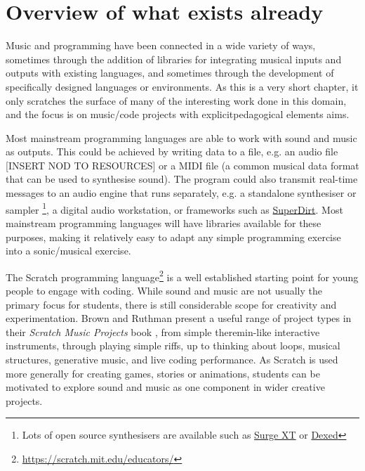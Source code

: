 \section{Overview of what exists already} \label{sec:literature}

Music and programming have been connected in a wide variety of ways, sometimes through the addition of libraries for integrating musical inputs and outputs with existing languages, and sometimes through the development of specifically designed languages or environments. As this is a very short chapter, it only scratches the surface of many of the interesting work done in this domain, and the focus is on music/code projects with explicitpedagogical elements aims.

Most mainstream programming languages are able to work with sound and music as outputs. This could be achieved by writing data to a file, e.g. an audio file [INSERT NOD TO RESOURCES] or a MIDI file (a common musical data format that can be used to synthesise sound). The program could also transmit real-time messages to an audio engine that runs separately, e.g. a standalone synthesiser or sampler \footnote{Lots of open source synthesisers are available such as \href{https://surge-synthesizer.github.io/}{Surge XT} or \href{https://asb2m10.github.io/dexed/}{Dexed}}, a digital audio workstation, or frameworks such as \href{https://github.com/musikinformatik/SuperDirt}{SuperDirt}. Most mainstream programming languages will have libraries available for these purposes, making it relatively easy to adapt any simple programming exercise into a sonic/musical exercise. %


The Scratch programming language\footnote{\url{https://scratch.mit.edu/educators/}} is a well established starting point for young people to engage with coding. While sound and music are not usually the primary focus for students, there is still considerable scope for creativity and experimentation. Brown and Ruthman present a useful range of project types in their \emph{Scratch Music Projects} book \cite{brown20}, from simple theremin-like interactive instruments, through playing simple riffs, up to thinking about loops, musical structures, generative music, and live coding performance. As Scratch is used more generally for creating games, stories or animations, students can be motivated to explore sound and music as one component in wider creative projects.


